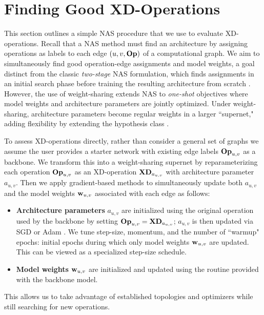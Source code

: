 
\section{Finding Good XD-Operations}\label{sec:chrysalis}

This section outlines a simple NAS procedure that we use to evaluate XD-operations.
Recall that a NAS method must find an architecture by assigning operations as labels to each edge $(u,v,\operatorname{\operatorname{\bf Op}})$ of a computational graph.
We aim to simultaneously find good operation-edge assignments and model weights, a goal distinct from the classic {\em two-stage} NAS formulation, which finds assignments in an initial search phase before training the resulting architecture from scratch \citep{ying2019nasbench101}.
However, the use of weight-sharing \citep{pham2018enas} extends NAS to {\em one-shot} objectives where model weights and architecture parameters are jointly optimized.
Under weight-sharing, architecture parameters become regular weights in a larger ``supernet," adding flexibility by extending the hypothesis class \citep{li2021gaea}.

To assess XD-operations directly, rather than consider a general set of graphs we assume the user provides a starter network with existing edge labels $\operatorname{\operatorname{\bf Op}}_{u,v}$ as a backbone.
We transform this into a weight-sharing supernet by reparameterizing each operation $\operatorname{\operatorname{\bf Op}}_{u,v}$ as an XD-operation $\mathbf{XD}_{a_{u,v}}$ with architecture parameter $a_{u,v}$.
Then we apply gradient-based methods to simultaneously update both $a_{u,v}$ and the model weights $\mathbf{w}_{u,v}$  associated with each edge as follows:
\begin{itemize}[leftmargin=*,topsep=-1pt,noitemsep]\setlength\itemsep{2pt}
	\item {\bf Architecture parameters} $a_{u,v}$ are initialized using the original operation used by the backbone by setting $\operatorname{\operatorname{\bf Op}}_{u,v}=\mathbf{XD}_{a_{u,v}}$;
	$a_{u,v}$ is then updated via SGD or Adam \citep{kingma2015adam}.
	We tune step-size, momentum, and the number of ``warmup" epochs: 
	initial epochs during which only model weights $\mathbf{w}_{u,v}$ are updated.
	This can be viewed as a specialized step-size schedule.
	\item {\bf Model weights} $\mathbf{w}_{u,v}$ are initialized and updated using the routine provided with the backbone model.
\end{itemize}
This allows us to take advantage of established topologies and optimizers while still searching for new operations.

